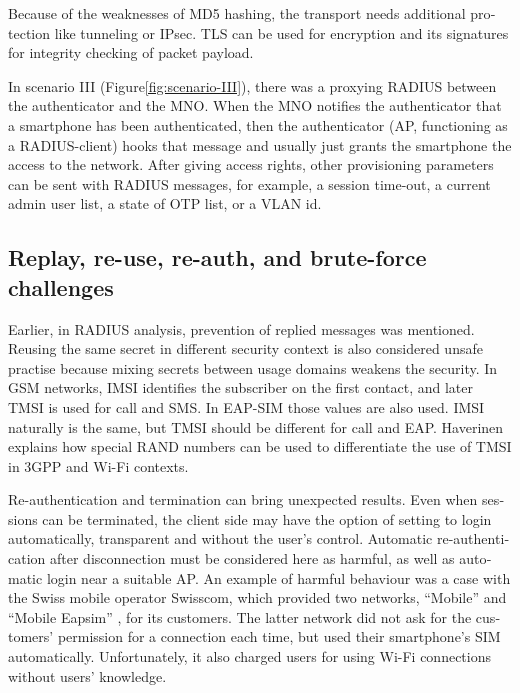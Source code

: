 \documentclass[12pt,a4paper,english]{tutthesis}
\begin{document}
\begin{otherlanguage}{english}
Because of the weaknesses of MD5 hashing, the transport needs additional protection
like tunneling or IPsec. TLS can be used for encryption and its
signatures for integrity checking of packet payload.





In scenario III (Figure\ref{fig:scenario-III}),  there was a proxying RADIUS
between the authenticator
and the MNO.  When the MNO notifies the authenticator
that a smartphone has been authenticated, then the authenticator (AP, functioning
as a RADIUS-client) hooks that message and usually just grants the
smartphone the access to the network. After giving access rights, other
provisioning parameters can be sent with RADIUS messages, for example,
a session time-out,
a current admin user list, a state of OTP list, or a VLAN id.


\subsection{Replay, re-use, re-auth, and brute-force challenges}
\label{sec-6-1-5}

Earlier, in RADIUS analysis, prevention of replied messages was
mentioned. Reusing the same secret in different security context is also
considered unsafe practise because mixing secrets between usage
domains weakens the security.  In GSM networks, IMSI identifies the subscriber on
the first contact, and later TMSI is used for call and SMS.  In EAP-SIM those
values are also used. IMSI naturally is the same, but TMSI should be
different for call and EAP.  Haverinen \cite{hav-doc} explains how
special RAND numbers can be used to differentiate the use of TMSI in 3GPP and Wi-Fi
contexts.

Re-authentication and termination can bring unexpected results.
Even when sessions can be terminated, the client side may have 
the option of  setting to login automatically, transparent and without
the user's control.
Automatic re-authentication after disconnection  must be considered
here as harmful, as well as automatic login near a suitable AP. An
example of harmful behaviour was a case with the  Swiss mobile operator Swisscom, which
 provided two networks, ``Mobile'' and ``Mobile Eapsim'' , for its
customers. 
The latter network did not ask for the customers' permission for
a connection each time, but used their smartphone's SIM
automatically. Unfortunately, it also charged users for using Wi-Fi
connections without users' knowledge. \cite{swisscom}




\end{otherlanguage}
\end{document}

